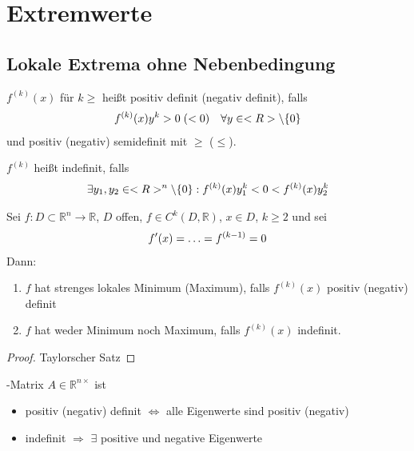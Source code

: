 \section{Extremwerte} \setcounter{equation}{0}
\subsection{Lokale Extrema ohne Nebenbedingung}

\begin{*definition}
	$f^{(k)}(x)$ für $k\ge $ heißt positiv definit (negativ definit), falls \begin{align}
		f^{(k)}(x) y^k > 0 \;(< 0) \quad\forall y\in\mathbb{R}\setminus \{0\}\notag
	\end{align}
	und positiv (negativ) semidefinit mit $\ge$ ($\le$).
	
	$f^{(k)}$ heißt indefinit, falls \begin{align}
		\exists y_1, y_2\in\mathbb{R}^n\setminus \{0\}: f^{(k)}(x) y_1^k < 0 < f^{(k)} (x) y_2^k\notag
	\end{align}
\end{*definition}

\begin{proposition}
	Sei $f:D\subset\mathbb{R}^n\to\mathbb{R}$, $D$ offen, $f\in C^k(D,\mathbb{R})$, $x\in D$, $k\ge 2$ und sei \begin{align}
		f'(x) = \dotsc = f^{(k-1)} = 0\notag
	\end{align}
	Dann: \begin{enumerate}[label={\alph*)}]
		\item $f$ hat strenges lokales Minimum (Maximum), falls $f^{(k)}(x)$ positiv (negativ) definit
		\item {}
		$f$ hat weder Minimum noch Maximum, falls $f^{(k)}(x)$ indefinit.
	\end{enumerate}
\end{proposition}

\begin{proof}\hspace*{0pt}
	Taylorscher Satz
\end{proof}

\begin{boldenvironment}
	-Matrix $A\in\mathbb{R}^{n\times}$ ist \begin{itemize}
		\item positiv (negativ) definit $\Leftrightarrow$ alle Eigenwerte sind positiv (negativ) 
		\item indefinit $\Rightarrow$ $\exists$ positive und negative Eigenwerte
	\end{itemize}
\end{boldenvironment}

